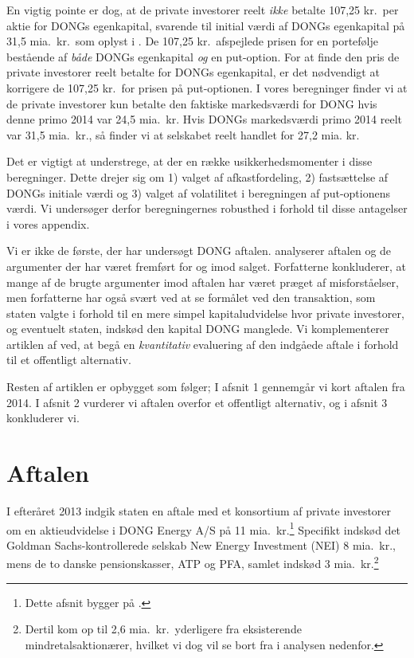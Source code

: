 \documentclass{article}
\begin{document}
En vigtig pointe er dog, at de private investorer reelt \emph{ikke} betalte 107,25 kr.\ per aktie for DONGs egenkapital, svarende til initial værdi af DONGs egenkapital på 31,5 mia.\ kr.\ som oplyst i  \cite{FM2013a}. De 107,25 kr.\ afspejlede prisen for en portefølje bestående af \emph{både} DONGs egenkapital \emph{og} en put-option. For at finde den pris de private investorer reelt betalte for DONGs egenkapital, er det nødvendigt at korrigere de 107,25 kr.\ for prisen på put-optionen. I vores beregninger finder vi at de private investorer kun betalte den faktiske markedsværdi for DONG hvis denne primo 2014 var 24,5 mia.\ kr. Hvis DONGs markedsværdi primo 2014 reelt var 31,5 mia.\ kr., så finder vi at selskabet reelt handlet for 27,2 mia. kr.

Det er vigtigt at understrege, at der en række usikkerhedsmomenter i disse beregninger. Dette drejer sig om 1) valget af afkastfordeling, 2) fastsættelse af DONGs initiale værdi og 3) valget af volatilitet i beregningen af put-optionens værdi. Vi undersøger derfor beregningernes robusthed i forhold til disse antagelser i vores appendix.

Vi er ikke de første, der har undersøgt DONG aftalen. \cite{Bachman2014} analyserer aftalen og de argumenter der har været fremført for og imod salget. Forfatterne konkluderer, at mange af de brugte argumenter imod aftalen har været præget af misforståelser, men forfatterne har også svært ved at se formålet ved den transaktion, som staten valgte i forhold til en mere simpel kapitaludvidelse hvor private investorer, og eventuelt staten, indskød den kapital DONG manglede. Vi komplementerer artiklen af \cite{Bachman2014} ved, at begå en \emph{kvantitativ} evaluering af den indgåede aftale i forhold til et offentligt alternativ. 

Resten af artiklen er opbygget som følger; I afsnit 1 gennemgår vi kort aftalen fra 2014. I afsnit 2 vurderer vi aftalen overfor et offentligt alternativ, og i afsnit 3 konkluderer vi.


\section{Aftalen}
I efteråret 2013 indgik staten en aftale med et konsortium af private investorer om en aktieudvidelse i DONG Energy A/S på 11 mia.\ kr.\footnote{Dette afsnit bygger på \citet{FM2013a}.} Specifikt indskød det Goldman Sachs-kontrollerede selskab New Energy Investment (NEI) 8 mia.\ kr., mens de to danske pensionskasser, ATP og PFA, samlet indskød 3 mia.\ kr.\footnote{Dertil kom op til 2,6 mia.\ kr.\ yderligere fra eksisterende mindretalsaktionærer, hvilket vi dog vil se bort fra i analysen nedenfor.}
\end{document}
